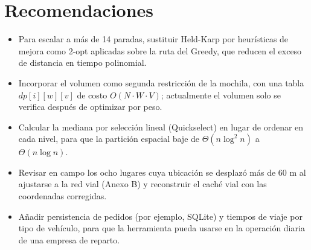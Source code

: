 \section{Recomendaciones}

\begin{itemize}
    \item Para escalar a más de 14 paradas, sustituir Held-Karp por heurísticas de mejora como 2-opt aplicadas sobre la ruta del Greedy, que reducen el exceso de distancia en tiempo polinomial.
    \item Incorporar el volumen como segunda restricción de la mochila, con una tabla $dp[i][w][v]$ de costo $O(N\cdot W\cdot V)$; actualmente el volumen solo se verifica después de optimizar por peso.
    \item Calcular la mediana por selección lineal (Quickselect) en lugar de ordenar en cada nivel, para que la partición espacial baje de $\Theta(n\log^2 n)$ a $\Theta(n\log n)$.
    \item Revisar en campo los ocho lugares cuya ubicación se desplazó más de 60 m al ajustarse a la red vial (Anexo B) y reconstruir el caché vial con las coordenadas corregidas.
    \item Añadir persistencia de pedidos (por ejemplo, SQLite) y tiempos de viaje por tipo de vehículo, para que la herramienta pueda usarse en la operación diaria de una empresa de reparto.
\end{itemize}
